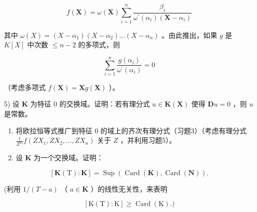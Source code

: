 \[
f (\mathbf {X}) = \omega (\mathbf {X}) \sum_ {i = 1} ^ {n} \frac {\beta_ {i}}{\omega^ {\prime} (\alpha_ {i}) (\mathbf {X} - \alpha_ {i})}
\]

其中 \(\omega(X) = (X - \alpha_1)(X - \alpha_2) \ldots (X - \alpha_n)\) 。由此推出，如果 \(g\) 是 \(K[X]\) 中次数 \(\leqslant n - 2\) 的多项式，则

\[
\sum_ {i = 1} ^ {n} \frac {g (\alpha_ {i})}{\omega^ {\prime} (\alpha_ {i})} = 0
\]

（考虑多项式 \(f(\mathbf{X}) = \mathbf{X}g(\mathbf{X})\) ）。

5) 设 \(\mathbf{K}\) 为特征 0 的交换域。证明：若有理分式 \(u \in \mathbf{K}(\mathbf{X})\) 使得 \(\mathbf{D}u = 0\) ，则 \(u\) 是常数。

\begin{enumerate}
\def\labelenumi{\arabic{enumi})}
\setcounter{enumi}{5}
\item
  将欧拉恒等式推广到特征 0 的域上的齐次有理分式（习题3）（考虑有理分式 \(\frac{1}{Z^m} f(ZX_1, ZX_2, ..., ZX_n)\) 关于 \(Z\) ，并利用习题5）。
\item
  设 \(\mathbf{K}\) 为一个交换域。证明：
\end{enumerate}

\[
[ \mathbf {K} (\mathrm{T}): \mathbf {K} ] = \operatorname{Sup} (\operatorname{Card} (\mathbf {K}), \operatorname{Card} (\mathbf {N})).
\]

(利用 \(1 / (T - a)\) （ \(a \in \mathbf{K}\) ）的线性无关性，来表明

\[
[ \mathrm{K} (\mathrm{T}): \mathrm{K} ] \geqslant \operatorname{Card} (\mathrm{K}).)
\]
\relax{}
